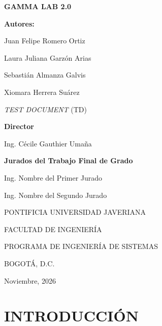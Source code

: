 \documentclass[12pt,letterpaper,oneside]{article}
\DeclareRobustCommand{\_}{\textunderscore\allowbreak}
\newcommand{\tituloProyecto}{GAMMA LAB 2.0}
\newcommand{\autorUno}{Juan Felipe Romero Ortiz}
\newcommand{\autorDos}{Laura Juliana Garzón Arias}
\newcommand{\autorTres}{Sebastián Almanza Galvis}
\newcommand{\autorCuatro}{Xiomara Herrera Suárez}
\newcommand{\nombreDocumento}{\textit{TEST DOCUMENT} (TD)}
\newcommand{\director}{Ing. Cécile Gauthier Umaña}
\newcommand{\juradoUno}{Ing. Nombre del Primer Jurado}
\newcommand{\juradoDos}{Ing. Nombre del Segundo Jurado}
\newcommand{\universidad}{PONTIFICIA UNIVERSIDAD JAVERIANA}
\newcommand{\facultad}{FACULTAD DE INGENIERÍA}
\newcommand{\programa}{PROGRAMA DE INGENIERÍA DE SISTEMAS}
\newcommand{\ciudad}{BOGOTÁ, D.C.}
\newcommand{\fechaLarga}{Noviembre, 2026}
\begin{document}

\begin{center}
  {\Large\bfseries \tituloProyecto}\par
  \vspace{1.4cm}

  {\bfseries Autores:}\par
  \vspace{0.5cm}
  \autorUno\par
  \autorDos\par
  \autorTres\par
  \autorCuatro\par
  \vspace{1.4cm}

  \nombreDocumento\par
  \vspace{1.4cm}

  {\bfseries Director}\par
  \vspace{0.4cm}
  \director\par
  \vspace{1.2cm}

  {\bfseries Jurados del Trabajo Final de Grado}\par
  \vspace{0.4cm}
  \juradoUno\par
  \juradoDos\par
  \vspace{1.8cm}

  \universidad\par\vspace{0.6cm}
  \facultad\par\vspace{0.6cm}
  \programa\par\vspace{0.6cm}
  \ciudad\par\vspace{0.6cm}
  \fechaLarga\par
\end{center}
\clearpage

\tableofcontents
\clearpage
\listoftables

\clearpage
{}

\section{INTRODUCCIÓN}
\end{document}
